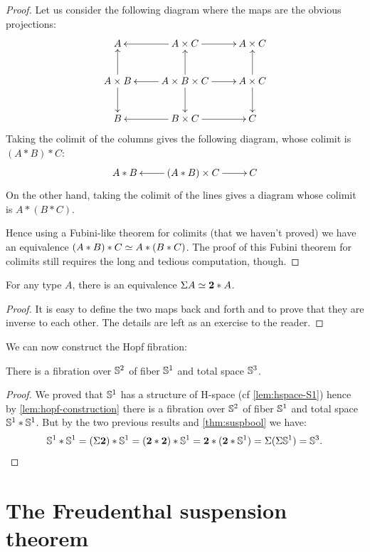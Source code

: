 \begin{proof}
  Let us consider the following diagram where the maps are the obvious
  projections:
  \[\xymatrix{
    A & A\times C \ar[l] \ar[r] & A\times C\\
    A\times B \ar[u] \ar[d] & A\times B\times C \ar[l]\ar[u]\ar[r]\ar[d] &
    A\times C \ar[u] \ar[d] \\
    B & B\times C \ar[l] \ar[r] & C}\]
  Taking the colimit of the columns gives the following
  diagram, whose colimit is $(A*B)*C$:
  \[\xymatrix{A*B & (A*B)\times C \ar[l]\ar[r] & C}\]
  On the other hand, taking the colimit of the lines gives a diagram whose
  colimit is $A*(B*C)$.

  Hence using a Fubini-like theorem for colimits (that we haven’t proved) we
  have an equivalence $(A*B)*C \simeq A*(B*C)$. The proof of this Fubini theorem
  for colimits still requires the long and tedious computation, though.
\end{proof}

\begin{lem}
  For any type $A$, there is an equivalence $\Sigma A \simeq \mathbf{2}*A$.
\end{lem}

\begin{proof}
  It is easy to define the two maps back and forth and to prove that they are
  inverse to each other. The details are left as an exercise to the reader.
\end{proof}

We can now construct the Hopf fibration:

\begin{thm}
  There is a fibration over $\mathbb{S}^2$ of fiber $\mathbb{S}^1$ and total space $\mathbb{S}^3$.
\end{thm}
\begin{proof}
  We proved that $\mathbb{S}^1$ has a structure of H-space (cf \cref{lem:hspace-S1})
  hence by \cref{lem:hopf-construction} there is a fibration over $\mathbb{S}^2$ of
  fiber $\mathbb{S}^1$ and total space $\mathbb{S}^1*\mathbb{S}^1$. But by the two previous results
  and \cref{thm:suspbool} we have:
  \begin{equation*}
    \mathbb{S}^1*\mathbb{S}^1 = (\Sigma\mathbf{2})*\mathbb{S}^1
    =(\mathbf{2}*\mathbf{2})*\mathbb{S}^1
    =\mathbf{2}*(\mathbf{2}*\mathbb{S}^1)
    =\Sigma(\Sigma\mathbb{S}^1)
    =\mathbb{S}^3. \qedhere
  \end{equation*}
\end{proof}

\section{The Freudenthal suspension theorem}
\label{sec:freudenthal}

